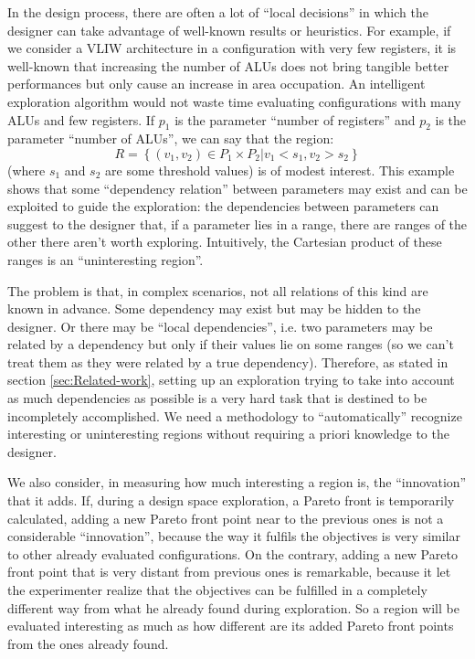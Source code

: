 In the design process, there are often a lot of ``local decisions''
in which the designer can take advantage of well-known results or
heuristics. For example, if we consider a VLIW architecture in a configuration with very few registers, it is well-known that increasing the number of ALUs does not bring tangible better performances
but only cause an increase in area occupation. An intelligent exploration
algorithm would not waste time evaluating configurations with many
ALUs and few registers. If $p_{1}$ is the parameter ``number of
registers'' and $p_{2}$ is the parameter ``number of ALUs'', we
can say that the region:
\[
R=\left\{ \left.\left(v_{1},v_{2}\right)\in P_{1}\times P_{2}\right|v_{1}<s_{1},v_{2}>s_{2}\right\} 
\]
 (where $s_{1}$ and $s_{2}$ are some threshold values) is of modest
interest. This example shows that some ``dependency relation'' between
parameters may exist and can be exploited to guide the exploration:
the dependencies between parameters can suggest to the designer that,
if a parameter lies in a range, there are ranges of the other there
aren't worth exploring. Intuitively, the Cartesian product of these
ranges is an ``uninteresting region''.

The problem is that, in complex scenarios, not all relations of this
kind are known in advance. Some dependency may exist but may be hidden
to the designer. Or there may be ``local dependencies'', i.e. two
parameters may be related by a dependency but only if their values
lie on some ranges (so we can't treat them as they were related by
a true dependency). Therefore, as stated in section \ref{sec:Related-work},
setting up an exploration trying to take into account as much dependencies
as possible is a very hard task that is destined to be incompletely
accomplished. We need a methodology to ``automatically'' recognize
interesting or uninteresting regions without requiring a priori knowledge
to the designer.

We also consider, in measuring how much interesting a region is, the
``innovation'' that it adds. If, during a design space exploration,
a Pareto front is temporarily calculated, adding a new Pareto front
point near to the previous ones is not a considerable ``innovation'',
because the way it fulfils the objectives is very similar to other
already evaluated configurations. On the contrary, adding a new Pareto
front point that is very distant from previous ones is remarkable,
because it let the experimenter realize that the objectives can be
fulfilled in a completely different way from what he already found
during exploration. So a region will be evaluated interesting as much
as how different are its added Pareto front points from the ones already
found.

